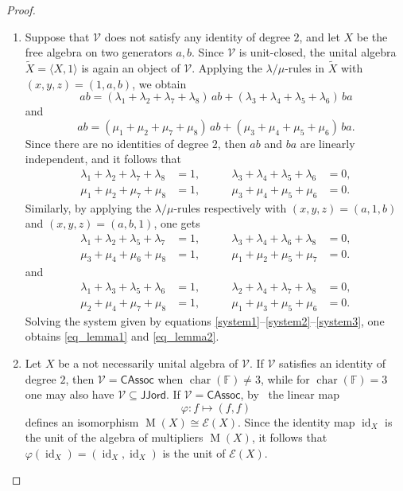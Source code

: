\documentclass[reqno,a4paper]{amsart}
\theoremstyle{plain}
\theoremstyle{definition}
\theoremstyle{remark}
\numberwithin{equation}{section}
\newcommand{\F}{\mathbb{F}}
\newcommand{\E}{\mathcal{E}}
\newcommand{\V}{\mathcal{V}}
\DeclareMathOperator{\bchar}{char}
\DeclareMathOperator{\M}{M}
\DeclareMathOperator{\id}{id}
\newcommand{\CAssoc}{\ensuremath{\mathsf{CAssoc}}}
\newcommand{\JJord}{\ensuremath{\mathsf{JJord}}}
\begin{document}
\begin{proof}{\ }
\begin{enumerate}
\item Suppose that $\V$ does not satisfy any identity of degree $2$, and let $X$ be the free algebra on two generators $a,b$. Since $\V$ is unit-closed, the unital algebra $\widetilde X=\langle X,1\rangle$ is again an object of $\V$. Applying the $\lambda/\mu$-rules in $\widetilde X$ with $(x,y,z)=(1,a,b)$, we obtain
\[
ab=(\lambda_1+\lambda_2+\lambda_7+\lambda_8)\,ab +(\lambda_3+\lambda_4+\lambda_5+\lambda_6)\,ba
\]
and
\[
ab=(\mu_1+\mu_2+\mu_7+\mu_8)\,ab +(\mu_3+\mu_4+\mu_5+\mu_6)\,ba.
\]
Since there are no identities of degree $2$, then $ab$ and $ba$
are linearly independent, and it follows that
\begin{equation}\label{system1}
\begin{alignedat}{2}
\lambda_1+\lambda_2+\lambda_7+\lambda_8 &= 1, \qquad &
\lambda_3+\lambda_4+\lambda_5+\lambda_6 &= 0, \\
\mu_1+\mu_2+\mu_7+\mu_8 &= 1, \qquad &
\mu_3+\mu_4+\mu_5+\mu_6 &= 0.
\end{alignedat}
\end{equation}
Similarly, by applying the $\lambda/\mu$-rules respectively with
$(x,y,z)=(a,1,b)$ and $(x,y,z)=(a,b,1)$, one gets
\begin{equation}\label{system2}
\begin{alignedat}{2}
\lambda_1+\lambda_2+\lambda_5+\lambda_7 &= 1, \qquad &
\lambda_3+\lambda_4+\lambda_6+\lambda_8 &= 0, \\
\mu_3+\mu_4+\mu_6+\mu_8 &= 1, \qquad &
\mu_1+\mu_2+\mu_5+\mu_7 &= 0.
\end{alignedat}
\end{equation}
and
\begin{equation}\label{system3}
\begin{alignedat}{2}
\lambda_1+\lambda_3+\lambda_5+\lambda_6 &= 1, \qquad &
\lambda_2+\lambda_4+\lambda_7+\lambda_8 &= 0, \\
\mu_2+\mu_4+\mu_7+\mu_8 &= 1, \qquad &
\mu_1+\mu_3+\mu_5+\mu_6 &= 0.
\end{alignedat}
\end{equation}
Solving the system given by equations
\eqref{system1}--\eqref{system2}--\eqref{system3}, one obtains
\eqref{eq_lemma1} and \eqref{eq_lemma2}.


\item Let $X$ be a not necessarily unital algebra of $\V$. If $\V$ satisfies an identity of degree $2$, then $\V=\CAssoc$ when $\bchar(\F)\neq 3$, while for $\bchar(\F)=3$ one may also have $\V \subseteq \JJord$. If $\V=\CAssoc$, by~\cite[Theorem~3.9(5)]{WRAAlg} the linear map
\[
\varphi \colon f \mapsto (f,f)
\]
defines an isomorphism $\M(X) \cong \E(X)$. Since the identity map $\id_X$ is the unit of the algebra of multipliers $\M(X)$, it follows that $\varphi(\id_X)=(\id_X,\id_X)$ is the unit of $\E(X)$. 


\end{enumerate}
\end{proof}
\end{document}
